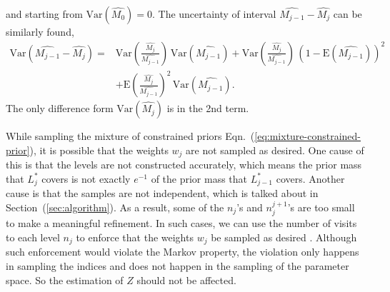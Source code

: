 \documentclass[letterpaper, preprint]{aastex}
\begin{document}
and starting from $\mathrm{Var}\left(\widehat{M_0}\right)=0$. The uncertainty of interval $\widehat{M_{j-1}}-\widehat{M_{j}}$ can be similarly found,
\begin{align}
\mathrm{Var}\left(\widehat{M_{j-1}}-\widehat{M_{j}}\right)=&\mathrm{Var}\left(\frac{\widehat{M_{j}}}{\widehat{M_{j-1}}}\right)\,\mathrm{Var}\left(\widehat{M_{j-1}}\right)+\mathrm{Var}\left(\frac{\widehat{M_{j}}}{\widehat{M_{j-1}}}\right)\,\left(1-\mathrm{E}\left(\widehat{M_{j-1}}\right)\right)^2 \nonumber\\
&+\mathrm{E}\left(\frac{\widehat{M_{j}}}{\widehat{M_{j-1}}}\right)^2\,\mathrm{Var}\left(\widehat{M_{j-1}}\right).
\label{eq:refine-interval-variance}
\end{align}
The only difference form $\mathrm{Var}\left(\widehat{M_{j}}\right)$ is in the 2nd term.

While sampling the mixture of constrained priors Eqn.~(\ref{eq:mixture-constrained-prior}), it is possible that the weights $w_j$ are not sampled as desired. One cause of this is that the levels are not constructed accurately, which means the prior mass that $L^*_j$ covers is not exactly $e^{-1}$ of the prior mass that $L^*_{j-1}$ covers. Another cause is that the samples are not independent, which is talked about in Section~(\ref{sec:algorithm}). As a result, some of the $n_j$'s and $n_j^{j+1}$'s are too small to make a meaningful refinement. In such cases, we can use the number of visits to each level $n_j$ to enforce that the weights $w_j$ be sampled as desired \citep{brewer11a}. Although such enforcement would violate the Markov property, the violation only happens in sampling the indices and does not happen in the sampling of the parameter space. So the estimation of $Z$ should not be affected.
\end{document}
